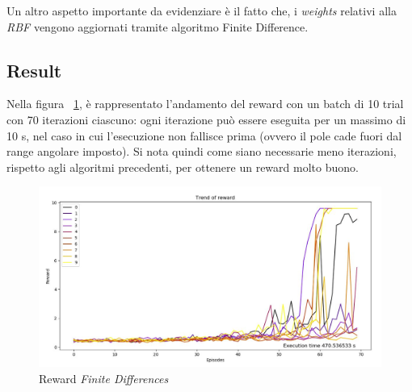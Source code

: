 Un altro aspetto importante da evidenziare è il fatto che, i \textit{weights} relativi alla \textit{RBF} vengono aggiornati tramite algoritmo Finite Difference.

\subsection{Result}
Nella figura ~\ref{fig:Reward_FD}, è rappresentato l'andamento del reward con un batch di 10 trial con 70 iterazioni ciascuno: ogni iterazione può essere eseguita per un massimo di 10 s, nel caso in cui l'esecuzione non fallisce prima (ovvero il pole cade fuori dal range angolare imposto).
Si nota quindi come siano necessarie meno iterazioni, rispetto agli algoritmi precedenti, per ottenere un reward molto buono.

\begin{figure}[!h]
	\centering
	\includegraphics[width=\textwidth]{Immagini/Reward_FD.JPG}
	\caption{Reward \textit{Finite Differences}}
	\label{fig:Reward_FD}
\end{figure}

\newpage